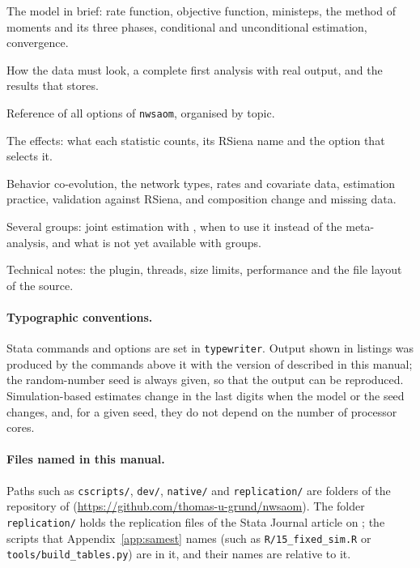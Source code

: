 \begin{description}[style=nextline,nosep]
  \item[Chapter~\ref{ch:model}] The model in brief: rate function, objective function, ministeps, the method of moments and its three phases, conditional and unconditional estimation, convergence.
  \item[Chapter~\ref{ch:start}] How the data must look, a complete first analysis with real output, and the results that \nwsaom{} stores.
  \item[Chapter~\ref{ch:options}] Reference of all options of \texttt{nwsaom}, organised by topic.
  \item[Chapter~\ref{ch:effects}] The effects: what each statistic counts, its RSiena name and the option that selects it.
  \item[Later chapters] Behavior co-evolution, the network types, rates and covariate data, estimation practice, validation against RSiena, and composition change and missing data.
  \item[Chapter~\ref{ch:groups}] Several groups: joint estimation with , when to use it instead of the meta-analysis, and what is not yet available with groups.
  \item[Chapter~\ref{ch:technical}] Technical notes: the plugin, threads, size limits, performance and the file layout of the source.
\end{description}

\paragraph{Typographic conventions.} Stata commands and options are set in \texttt{typewriter}. Output shown in listings was produced by the commands above it with the version of \nwsaom{} described in this manual; the random-number seed is always given, so that the output can be reproduced. Simulation-based estimates change in the last digits when the model or the seed changes, and, for a given seed, they do not depend on the number of processor cores.

\paragraph{Files named in this manual.} Paths such as \texttt{cscripts/}, \texttt{dev/}, \texttt{native/} and \texttt{replication/} are folders of the repository of \nwsaom{} (\url{https://github.com/thomas-u-grund/nwsaom}). The folder \texttt{replication/} holds the replication files of the Stata Journal article on \nwsaom{}; the scripts that Appendix~\ref{app:samest} names (such as \texttt{R/15\_fixed\_sim.R} or \texttt{tools/build\_tables.py}) are in it, and their names are relative to it.
